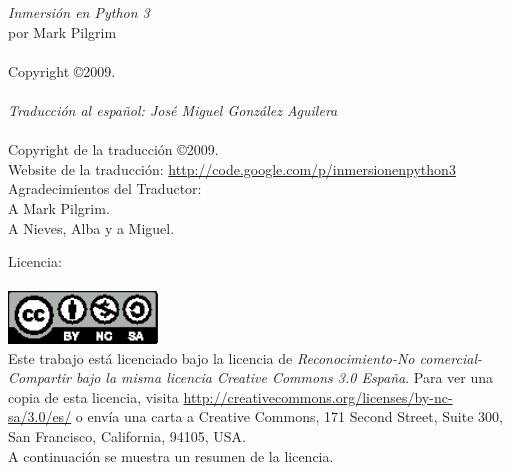 \pagestyle{empty}
\frontmatter
\noindent
\textsf{\emph{Inmersión en Python 3}}\\
por Mark Pilgrim\\
\\
Copyright \copyright 2009.\\
\\
\textsf{\emph{Traducción al español: José Miguel González Aguilera}}\\
\\
Copyright de la traducción \copyright 2009.\\
Website de la traducción: \href{http://code.google.com/p/inmersionenpython3}{http://code.google.com/p/inmersionenpython3}\\
\linebreak 
\noindent
Agradecimientos del Traductor:\\
A Mark Pilgrim.\\
A Nieves, Alba y a Miguel.

\noindent
Licencia:\\
\\
\includegraphics[width=40mm]{by-nc-sa.png}\\
Este trabajo está licenciado bajo la licencia de \emph{Reconocimiento-No comercial-Compartir bajo la misma licencia Creative Commons 3.0 España}. Para ver una copia de esta licencia, visita \href{http://creativecommons.org/licenses/by-nc-sa/3.0/es/}{http://creativecommons.org/licenses/by-nc-sa/3.0/es/} o envía una carta a Creative Commons, 171 Second Street, Suite 300, San Francisco, California, 94105, USA.\\

\noindent
A continuación se muestra un resumen de la licencia.\\

